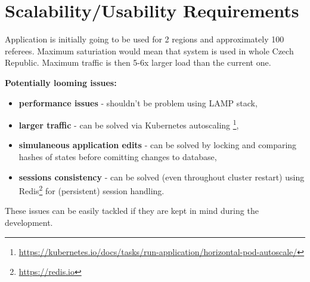 \section{Scalability/Usability Requirements}
Application is initially going to be used for 2 regions and approximately 100 referees. Maximum saturiation would mean that system is used in whole Czech Republic. Maximum traffic is then 5-6x larger load than the current one.
\newline
\par
\textbf{Potentially looming issues:}
\begin{itemize}
  \item \textbf{performance issues} - shouldn't be problem using LAMP stack, 
  \item \textbf{larger traffic} - can be solved via Kubernetes autoscaling \footnote{\url{https://kubernetes.io/docs/tasks/run-application/horizontal-pod-autoscale/}},  
  \item \textbf{simulaneous application edits} - can be solved by locking and comparing hashes of states before comitting changes to database,
  \item \textbf{sessions consistency} - can be solved (even throughout cluster restart) using Redis\footnote{\url{https://redis.io}} for (persistent) session handling.
\end{itemize}
These issues can be easily tackled if they are kept in mind during the development.